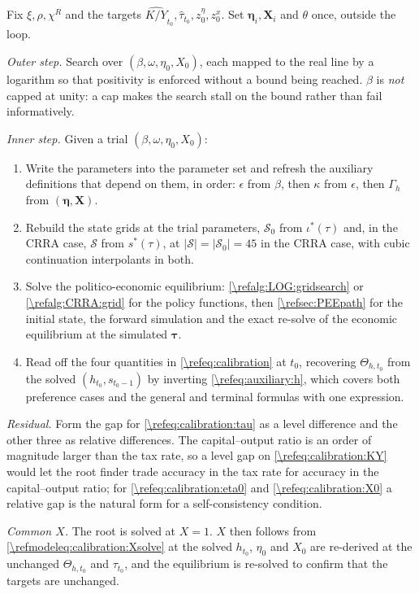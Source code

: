 \begin{alg}\label{\refalg:calibration}
Fix $\xi,\rho,\chi^R$ and the targets $\widehat{K/Y}_{t_0},\hat{\tau}_{t_0},z_0^{\eta},z_0^x$. Set $\bm{\eta}_i,\bm{X}_i$ and $\theta$ once, outside the loop.

\smallskip\noindent\emph{Outer step.} Search over $\left(\beta,\omega,\eta_0,X_0\right)$, each mapped to the real line by a logarithm so that positivity is enforced without a bound being reached. $\beta$ is \emph{not} capped at unity: a cap makes the search stall on the bound rather than fail informatively.

\smallskip\noindent\emph{Inner step.} Given a trial $\left(\beta,\omega,\eta_0,X_0\right)$:
\begin{enumerate}
    \item Write the parameters into the parameter set and refresh the auxiliary definitions that depend on them, in order: $\epsilon$ from $\beta$, then $\kappa$ from $\epsilon$, then $\Gamma_h$ from $\left(\bm{\eta},\bm{X}\right)$.
    \item Rebuild the state grids at the trial parameters, $\mathcal{S}_0$ from $\iota^*(\tau)$ and, in the CRRA case, $\mathcal{S}$ from $s^*(\tau)$, at $\vert\mathcal{S}\vert=\vert\mathcal{S}_0\vert=45$ in the CRRA case, with cubic continuation interpolants in both.
    \item Solve the politico-economic equilibrium: \cref{\refalg:LOG:gridsearch} or \cref{\refalg:CRRA:grid} for the policy functions, then \cref{\refsec:PEEpath} for the initial state, the forward simulation and the exact re-solve of the economic equilibrium at the simulated $\bm{\tau}$.
    \item Read off the four quantities in \eqref{\refeq:calibration} at $t_0$, recovering $\Theta_{h,t_0}$ from the solved $\left(h_{t_0},s_{t_0-1}\right)$ by inverting \eqref{\refeq:auxiliary:h}, which covers both preference cases and the general and terminal formulas with one expression.
\end{enumerate}

\smallskip\noindent\emph{Residual.} Form the gap for \eqref{\refeq:calibration:tau} as a level difference and the other three as relative differences. The capital--output ratio is an order of magnitude larger than the tax rate, so a level gap on \eqref{\refeq:calibration:KY} would let the root finder trade accuracy in the tax rate for accuracy in the capital--output ratio; for \eqref{\refeq:calibration:eta0} and \eqref{\refeq:calibration:X0} a relative gap is the natural form for a self-consistency condition.

\smallskip\noindent\emph{Common $X$.} The root is solved at $X = 1$. $X$ then follows from \eqref{\refmodeleq:calibration:Xsolve} at the solved $h_{t_0}$, $\eta_0$ and $X_0$ are re-derived at the unchanged $\Theta_{h,t_0}$ and $\tau_{t_0}$, and the equilibrium is re-solved to confirm that the targets are unchanged.
\end{alg}

